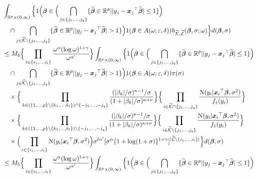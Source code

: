 \documentclass[12pt]{article}
\def\ep{{\varepsilon}}
\def\si{{\sigma}}
\def\al{{\alpha}}
\def\be{{\beta}}
\def\ga{{\gamma}}
\def\de{{\delta}}
\def\ep{{\varepsilon}}
\def\si{{\sigma}}
\def\om{{\omega}}
\def\non{{\nonumber}}
\def\Lc{{\cal L}}
\def\Kc{{\cal K}}
\def\al{{\alpha}}
\def\be{{\beta}}
\def\ga{{\gamma}}
\def\de{{\delta}}
\def\ep{{\varepsilon}}
\def\si{{\sigma}}
\def\om{{\omega}}
\def\ka{{\kappa}}
\def\bbe{{\text{\boldmath $\beta$}}}
\def\bbet{{\widetilde \bbe}}
\def\x{{\text{\boldmath $x$}}}
\def\Lc{{\cal L}}
\def\Kc{{\cal K}}
\def\non{{\nonumber}}
\begin{document}
\begin{align}
&\int_{\mathbb{R} ^p \times (0, \infty )} \Big\{ 1 \Big( \bbe \in \Big( \bigcap_{j \in \{ j_1 , \dots , j_q \} } \{ \bbet \in \mathbb{R} ^p | | y_j - {\x _j}^{\top } \bbet | \le 1 \} \Big) \non \\
&\quad \cap \bigcap_{j \in \widehat{\Kc } \setminus \{ j_1 , \dots , j_q \} } \{ \bbet \in \mathbb{R} ^p | | y_j - {\x _j}^{\top } \bbet | > 1 \} \Big) 1( \bbe \in A( \om ; \ep , \de )) h_{\widetilde{\Kc } , \widetilde{\Lc }} ( \bbe , \si ; \om ) \Big\} d( \bbe , \si ) \non \\
&\le M_4 \Big\{ \prod_{i \in \{ i_1 , \dots , i_l \} } {\om ^{\al } ( \log \om )^{1 + \ga } \over \om ^{{\al }'}} \Big\} \int_{\mathbb{R} ^p \times (0, \infty )} \Big\{ 1 \Big( \bbe \in \Big( \bigcap_{j \in \{ j_1 , \dots , j_q \} } \{ \bbet \in \mathbb{R} ^p | | y_j - {\x _j}^{\top } \bbet | \le 1 \} \Big) \non \\
&\quad \cap \bigcap_{j \in \widehat{\Kc } \setminus \{ j_1 , \dots , j_q \} } \{ \bbet \in \mathbb{R} ^p | | y_j - {\x _j}^{\top } \bbet | > 1 \} \Big) 1( \bbe \in A( \om ; \ep , \de )) \pi ( \si ) \non \\
&\quad \times \Big\{ \prod_{k \in ( \{ 1, \dots , p \} \setminus \{ k_1 , \dots , k_l \} ) \cap \{ - j_1 , \dots , - j_q \} } {(| \be _k | / \si )^{\ka - 1} / \si \over (1 + | \be _k | / \si )^{\ka + \nu }} \Big\} \Big\{ \prod_{i \in \widetilde{\Kc } \cap \{ j_1 , \dots , j_q \} } {{\rm{N}} ( y_i | {\x _i}^{\top } \bbe , \si ^2 ) \over f_1 ( y_i )} \Big\} \non \\
&\quad \times \Big\{ \prod_{k \in ( \{ 1, \dots , p \} \setminus \{ k_1 , \dots , k_l \} ) \setminus \{ - j_1 , \dots , - j_q \} } {(| \be _k | / \si )^{\ka - 1} / \si \over (1 + | \be _k | / \si )^{\ka + \nu }} \Big\} \Big\{ \prod_{i \in \widetilde{\Kc } \setminus \{ j_1 , \dots , j_q \} } {{\rm{N}} ( y_i | {\x _i}^{\top } \bbe , \si ^2 ) \over f_1 ( y_i )} \Big\} \non \\
&\quad \times \Big( \prod_{i \in \{ i_1 , \dots , i_l \} } {\rm{N}} ( y_i | {\x _i}^{\top } \bbe , \si ^2 ) \Big) \si ^{l {\al }'} [ \si ^{\al } \{ 1 + \log (1 + \si ) \} ^{1 + \ga } ]^{| \widetilde{\Lc } \setminus \{ i_1 , \dots , i_l \} |} \Big\} d( \bbe , \si ) \non \\
&\le M_5 \Big\{ \prod_{i \in \{ i_1 , \dots , i_l \} } {\om ^{\al } ( \log \om )^{1 + \ga } \over \om ^{{\al }'}} \Big\} \int_{\mathbb{R} ^p \times (0, \infty )} \Big\{ 1 \Big( \bbe \in \Big( \bigcap_{j \in \{ j_1 , \dots , j_q \} } \{ \bbet \in \mathbb{R} ^p | | y_j - {\x _j}^{\top } \bbet | \le 1 \} \Big) \non \\

\end{align}
\end{document}
